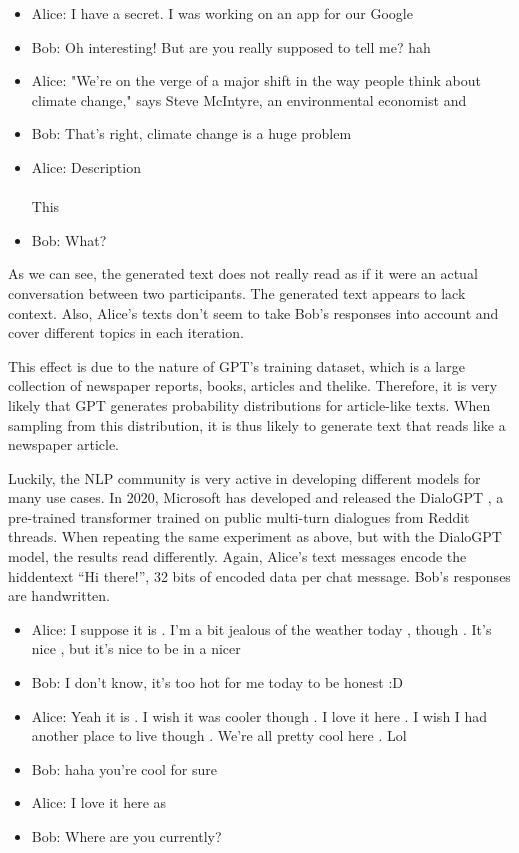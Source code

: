 \begin{example}
\leavevmode
\begin{itemize}
\item Alice: I have a secret. I was working on an app for our Google
\item Bob:   Oh interesting! But are you really supposed to tell me? hah
\item Alice: "We're on the verge of a major shift in the way people think about climate change," says Steve McIntyre, an environmental economist and
\item Bob:   That's right, climate change is a huge problem
\item Alice: Description \\
\\
       This
\item Bob:   What?
\end{itemize}
\end{example}

As we can see, the generated text does not really read as if it were an actual conversation between two participants.
The generated text appears to lack context.
Also, Alice's texts don't seem to take Bob's responses into account and cover different topics in each iteration.

This effect is due to the nature of GPT's training dataset, which is a large collection of newspaper reports, books, articles and thelike.
Therefore, it is very likely that GPT generates probability distributions for article-like texts.
When sampling from this distribution, it is thus likely to generate text that reads like a newspaper article.

Luckily, the NLP community is very active in developing different models for many use cases.
In 2020, Microsoft has developed and released the DialoGPT \cite{Zhang2020}, a pre-trained transformer trained on public multi-turn dialogues from Reddit threads.
When repeating the same experiment as above, but with the DialoGPT model, the results read differently.
Again, Alice's text messages encode the hiddentext ``Hi there!'', 32 bits of encoded data per chat message.
Bob's responses are handwritten.

\begin{example}
\leavevmode
\begin{itemize}
\item Alice: I suppose it is . I'm a bit jealous of the weather today , though . It's nice , but it's nice to be in a nicer
\item Bob:   I don't know, it's too hot for me today to be honest :D
\item Alice: Yeah it is . I wish it was cooler though . I love it here . I wish I had another place to live though . We're all pretty cool here . Lol
\item Bob:   haha you're cool for sure
\item Alice: I love it here as
\item Bob:   Where are you currently?
\end{itemize}


\end{example}